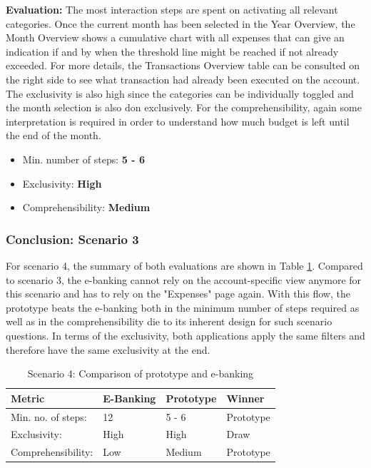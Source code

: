 \textbf{Evaluation:} The most interaction steps are spent on activating all relevant categories. Once the current month has been selected in the Year Overview, the Month Overview shows a cumulative chart with all expenses that can give an indication if and by when the threshold line might be reached if not already exceeded. For more details, the Transactions Overview table can be consulted on the right side to see what transaction had already been executed on the account. The exclusivity is also high since the categories can be individually toggled and the month selection is also don exclusively. For the comprehensibility, again some interpretation is required in order to understand how much budget is left until the end of the month.
\begin{itemize}[noitemsep,nolistsep]
	\item Min. number of steps: \textbf{5 - 6}
	\item Exclusivity: \textbf{High}
	\item Comprehensibility: \textbf{Medium}
\end{itemize}



\subsubsection{Conclusion: Scenario 3}

For scenario 4, the summary of both evaluations are shown in Table \ref{tbl:scenariofourcomparison}. Compared to scenario 3, the e-banking cannot rely on the account-specific view anymore for this scenario and has to rely on the "Expenses" page again. With this flow, the prototype beats the e-banking both in the minimum number of steps required as well as in the comprehensibility die to its inherent design for such scenario questions. In terms of the exclusivity, both applications apply the same filters and therefore have the same exclusivity at the end.
\begin{table}[h]
	\begin{center}
		\begin{tabular}{ | p{3.2cm} | p{3.8cm} | p{3.5cm} | p{2.5cm} | }
			\hline
			\textbf{Metric} & \textbf{E-Banking} & \textbf{Prototype} & \textbf{Winner} \\
			\hline
			Min. no. of steps: & 12 & 5 - 6 & Prototype \\
			\hline
			Exclusivity: & High & High & Draw \\
			\hline
			Comprehensibility: & Low & Medium & Prototype \\
			\hline
		\end{tabular}
		\caption{Scenario 4: Comparison of prototype and e-banking}
		\label{tbl:scenariofourcomparison}
	\end{center}
\end{table}


